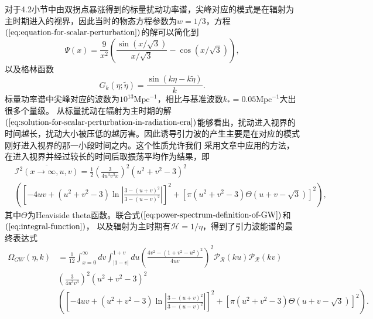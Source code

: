对于4.2小节中由双拐点暴涨得到的标量扰动功率谱，尖峰对应的模式是在辐射为主时期进入的视界，因此当时的物态方程参数为$w=1
/3$，方程$(\ref{eq:equation-for-scalar-perturbation})$的解可以简化到
\begin{equation}
  \label{eq:solution-for-scalar-perturbation-in-radiation-era}
  \Psi(x) = \frac{9}{x^2}{\left(\frac{\sin(x /\sqrt{3})}{x/ \sqrt{3}}
  -\cos(x /\sqrt{3})\right)},
\end{equation}
以及格林函数
\begin{equation}
  \label{eq:green-function-in-radiation-era}
  G_{k}(\eta;\tilde{\eta}) = \frac{\sin(k\eta-k \tilde{\eta})}{k}.
\end{equation}
标量功率谱中尖峰对应的波数为$10^{13}\text{Mpc}^{-1}$，相比与基准波数$k_{*}=0.05\text{Mpc}^{-1}$\citep{akrami2018planck}大出很多个量级。
从标量扰动在辐射为主时期的解$(\ref{eq:solution-for-scalar-perturbation-in-radiation-era})$能够看出，扰动进入视界的时间越长，扰动大小被压低的越厉害。因此诱导引力波的产生主要是在对应的模式刚好进入视界的那一小段时间之内。这个性质允许我们
采用文章\citep{kohri2018semianalytic}中应用的方法，在进入视界并经过较长的时间后取振荡平均作为结果，即
\begin{equation}
  \label{eq:oscillation-average-after-entering-horizon}
  \begin{split}
    &\overline{\mathcal{I}^2(x\rightarrow \infty,u,v)} = 
    \frac{1}{2}{\left(\frac{3}{4u^3v^3x}\right)}^2{\left(u^2+v^2-3\right)}^2
    \\
    &{\left({\left[-4uv+(u^2+v^2-3)\ln \left\lvert
      \frac{3-{\left(u+v\right)}^2}{3-{\left(u-v\right)}^2}\right\rvert\right]}^2+{\left[\pi
     (u^2+v^2-3)\Theta(u+v-\sqrt{3}) \right]}^2\right)},
  \end{split}
\end{equation}
其中$\Theta$为Heaviside
theta函数。联合式$(\ref{eq:power-spectrum-definition-of-GW})$和$(\ref{eq:integral-function})$，
以及辐射为主时期有$\mathcal{H}=1 /\eta$，得到了引力波能谱的最终表达式
\begin{equation}
  \label{eq:final-energy-spectrum-of-GW} 
  \begin{split}
    \Omega_{GW}(\eta, k) &= \frac{1}{12} \int_{x=0}^{\infty}dv \int_{\lvert
    1-v\rvert}^{1+v} du
    {\left(\frac{4v^2-{\left(1+v^2-u^2\right)}^2}{4uv}\right)}^2
    \mathcal{P}_{\mathcal{R}}(ku) \mathcal{P}_{\mathcal{R}}(kv) \\
    & {\left(\frac{3}{4u^3v^3}\right)}^2 {\left(u^2+v^2-3\right)}^2 \\
    &{\left(
    {\left[-4uv+(u^2+v^2-3)\ln \left\lvert
\frac{3-{\left(u+v\right)}^2}{3-{\left(u-v\right)}^2}\right\rvert\right]}^2
+ {\left[\pi (u^2+v^2-3)\Theta(u+v- \sqrt{3})\right]}^2\right)}.
  \end{split}
\end{equation}

